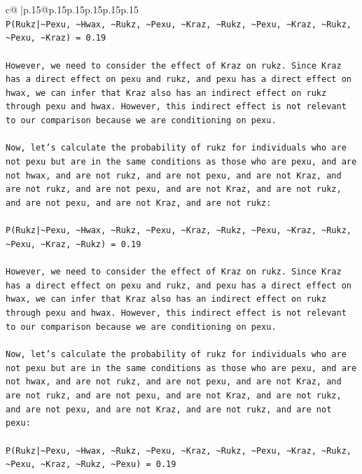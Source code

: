 \documentclass{article}
\begin{document}
{\begin{supertabular}{c@{$\;$}|p{.15\linewidth}@{}p{.15\linewidth}p{.15\linewidth}p{.15\linewidth}p{.15\linewidth}p{.15\linewidth}}
{{{\\ 
\texttt{P(Rukz|\textasciitilde{}Pexu, \textasciitilde{}Hwax, \textasciitilde{}Rukz, \textasciitilde{}Pexu, \textasciitilde{}Kraz, \textasciitilde{}Rukz, \textasciitilde{}Pexu, \textasciitilde{}Kraz, \textasciitilde{}Rukz, \textasciitilde{}Pexu, \textasciitilde{}Kraz) = 0.19} \\
\\ 
\texttt{However, we need to consider the effect of Kraz on rukz. Since Kraz has a direct effect on pexu and rukz, and pexu has a direct effect on hwax, we can infer that Kraz also has an indirect effect on rukz through pexu and hwax. However, this indirect effect is not relevant to our comparison because we are conditioning on pexu.} \\
\\ 
\texttt{Now, let's calculate the probability of rukz for individuals who are not pexu but are in the same conditions as those who are pexu, and are not hwax, and are not rukz, and are not pexu, and are not Kraz, and are not rukz, and are not pexu, and are not Kraz, and are not rukz, and are not pexu, and are not Kraz, and are not rukz:} \\
\\ 
\texttt{P(Rukz|\textasciitilde{}Pexu, \textasciitilde{}Hwax, \textasciitilde{}Rukz, \textasciitilde{}Pexu, \textasciitilde{}Kraz, \textasciitilde{}Rukz, \textasciitilde{}Pexu, \textasciitilde{}Kraz, \textasciitilde{}Rukz, \textasciitilde{}Pexu, \textasciitilde{}Kraz, \textasciitilde{}Rukz) = 0.19} \\
\\ 
\texttt{However, we need to consider the effect of Kraz on rukz. Since Kraz has a direct effect on pexu and rukz, and pexu has a direct effect on hwax, we can infer that Kraz also has an indirect effect on rukz through pexu and hwax. However, this indirect effect is not relevant to our comparison because we are conditioning on pexu.} \\
\\ 
\texttt{Now, let's calculate the probability of rukz for individuals who are not pexu but are in the same conditions as those who are pexu, and are not hwax, and are not rukz, and are not pexu, and are not Kraz, and are not rukz, and are not pexu, and are not Kraz, and are not rukz, and are not pexu, and are not Kraz, and are not rukz, and are not pexu:} \\
\\ 
\texttt{P(Rukz|\textasciitilde{}Pexu, \textasciitilde{}Hwax, \textasciitilde{}Rukz, \textasciitilde{}Pexu, \textasciitilde{}Kraz, \textasciitilde{}Rukz, \textasciitilde{}Pexu, \textasciitilde{}Kraz, \textasciitilde{}Rukz, \textasciitilde{}Pexu, \textasciitilde{}Kraz, \textasciitilde{}Rukz, \textasciitilde{}Pexu) = 0.19} \\
}}}
\end{supertabular}}
\end{document}
